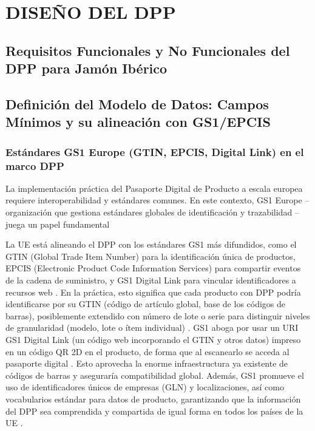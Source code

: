 \chapter{DISEÑO DEL DPP}\label{ch:diseño}

\section{Requisitos Funcionales y No Funcionales del DPP para Jamón Ibérico}\label{sec:diseño-requisitos}

\section{Definición del Modelo de Datos: Campos Mínimos y su alineación con GS1/EPCIS}\label{sec:diseño-definicion}
\subsection{Estándares GS1 Europe (GTIN, EPCIS, Digital Link) en el marco DPP}
La implementación práctica del Pasaporte Digital de Producto a escala europea requiere interoperabilidad y estándares comunes. En este contexto, GS1 Europe – organización que gestiona estándares globales de identificación y trazabilidad – juega un papel fundamental

La UE está alineando el DPP con los estándares GS1 más difundidos, como el GTIN (Global Trade Item Number) para la identificación única de productos, EPCIS (Electronic Product Code Information Services) para compartir eventos de la cadena de suministro, y GS1 Digital Link para vincular identificadores a recursos web \cite{noauthor_communication_2025}. En la práctica, esto significa que cada producto con DPP podría identificarse por su GTIN (código de artículo global, base de los códigos de barras), posiblemente extendido con número de lote o serie para distinguir niveles de granularidad (modelo, lote o ítem individual) \cite{gs1_in_europe_gs1-standards-enabling-dpp_2024}. GS1 aboga por usar un URI GS1 Digital Link (un código web incorporando el GTIN y otros datos) impreso en un código QR 2D en el producto, de forma que al escanearlo se acceda al pasaporte digital \cite{noauthor_communication_2025}\cite{gs1_in_europe_gs1-standards-enabling-dpp_2024}. Esto aprovecha la enorme infraestructura ya existente de códigos de barras y aseguraría compatibilidad global. Además, GS1 promueve el uso de identificadores únicos de empresas (GLN) y localizaciones, así como vocabularios estándar para datos de producto, garantizando que la información del DPP sea comprendida y compartida de igual forma en todos los países de la UE \cite{noauthor_communication_2025}.

